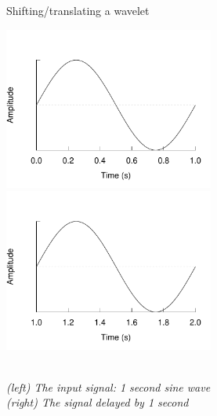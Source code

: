 \begin{figure}[h]
\caption{Shifting/translating a wavelet}\label{figure:shifting}
\caption*{\\[1em]\footnotesize\emph{(left) The input signal: 1 second sine
wave\\ (right) The signal delayed by 1 second}\rm}
\centering
	\includegraphics[width=196pt]{images/sine_full.pdf}
	\hspace{1em}
	\includegraphics[width=196pt]{images/sine_shifted.pdf}
\end{figure}